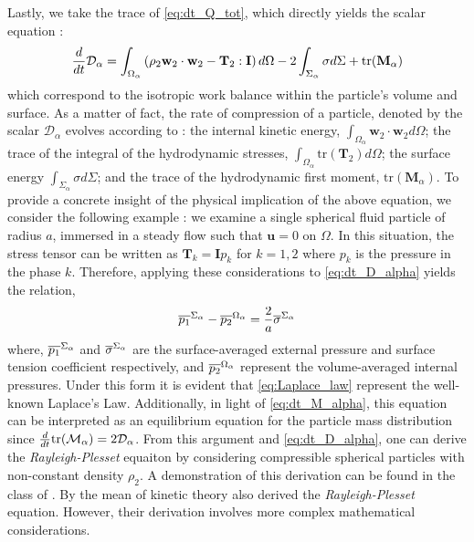 Lastly, we take the trace of \ref{eq:dt_Q_tot}, which directly yields the scalar equation :
\begin{equation}
    \frac{d}{d t} \mathcal{D}_\alpha
    = \int_{\Omega_\alpha} \left(
        \rho_2 \textbf{w}_2 \cdot \textbf{w}_2
        - \mathbf{T}_2 : \textbf{I}
        \right) d\Omega
        - 2\int_{\Sigma_\alpha} \sigma d\Sigma
        + \text{tr}(\textbf{M}_\alpha)
    \label{eq:dt_D_alpha}
\end{equation}
which correspond to the isotropic work balance within the particle's volume and surface. 
As a matter of fact, the rate of compression of a particle, denoted by the scalar $\mathcal{D}_\alpha$ evolves according to : 
the internal kinetic energy, $\int_{\Omega_\alpha} \textbf{w}_2 \cdot \textbf{w}_2 d\Omega$;
the trace of the integral of the hydrodynamic stresses, $\int_{\Omega_\alpha} \text{tr}(\textbf{T}_2)d\Omega$; 
the surface energy $\int_{\Sigma_\alpha} \sigma d\Sigma$; 
and the trace of the hydrodynamic first moment, $\text{tr}(\textbf{M}_\alpha)$.
To provide a concrete insight of the physical implication of the above equation, we consider the following example :
we examine a single spherical fluid particle of radius $a$, immersed in a steady flow such that $\textbf{u} = 0$ on $\Omega$. 
In this situation, the stress tensor can be written as $\textbf{T}_k = \textbf{I} p_k$ for $k = 1, 2$ where $p_k$ is the pressure in the phase $k$. 
Therefore, applying these considerations to \ref{eq:dt_D_alpha} yields the relation, 
\begin{equation*}
    \overline{p_1}^{\Sigma_\alpha}
    -  \overline{p_2}^{\Omega_\alpha} 
    =
    \frac{2}{a} \overline{\sigma}^{\Sigma_\alpha}
    \label{eq:Laplace_law}
\end{equation*}
where,  $\overline{p_1}^{\Sigma_\alpha}$ and  $\overline{\sigma}^{\Sigma_\alpha}$ are the surface-averaged external pressure and surface tension coefficient respectively, and $\overline{p_2}^{\Omega_\alpha}$ represent the volume-averaged internal pressures.
Under this form it is evident that \ref{eq:Laplace_law} represent the well-known Laplace's Law. 
Additionally, in light of \ref{eq:dt_M_alpha}, this equation can be interpreted as an equilibrium equation for the particle mass distribution since $\frac{d}{d t}\text{tr}(\mathcal{M}_\alpha) = 2 \mathcal{D}_\alpha$. 
From this argument and \ref{eq:dt_D_alpha}, one can derive the \textit{Rayleigh-Plesset} equaiton by considering compressible spherical particles with non-constant density $\rho_2$.
A demonstration of this derivation can be found in the class of . 
By the mean of kinetic theory \citet{zhang1994averaged} also derived the \textit{Rayleigh-Plesset} equation.
However, their derivation involves more complex mathematical considerations.


